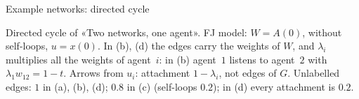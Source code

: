 \documentclass[10pt, aspectratio=169]{beamer}
\begin{document}
\begin{frame}[label=m-fj-graphs]{Example networks: directed cycle}
  \smallskip
  {\scriptsize Directed cycle of «Two networks, one agent». FJ model: $W = A(0)$, without self-loops,
  $u = x(0)$. In (b), (d) the edges carry the weights of $W$, and $\lambda_i$ multiplies all
  the weights of agent~$i$: in (b) agent~$1$ listens to agent~$2$ with
  $\lambda_1 w_{12} = 1 - t$. Arrows from $u_i$: attachment $1 - \lambda_i$, not edges of $G$.
  Unlabelled edges: $1$ in (a), (b), (d); $0.8$ in (c) (self-loops $0.2$); in (d) every
  attachment is $0.2$.\par}


\end{frame}
\end{document}
